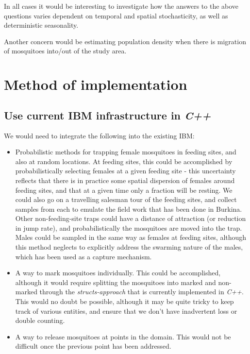 \documentclass{article}
\begin{document}
In all cases it would be interesting to investigate how the answers to the above questions varies dependent on temporal and spatial stochasticity, as well as deterministic seasonality.

Another concern would be estimating population density when there is migration of mosquitoes into/out of the study area.

\section{Method of implementation}
\subsection{Use current IBM infrastructure in \textit{C++}}
We would need to integrate the following into the existing IBM:

\begin{itemize}
\item Probabilistic methods for trapping female mosquitoes in feeding sites, and also at random locations. At feeding sites, this could be accomplished by probabilistically selecting females at a given feeding site - this uncertainty reflects that there is in practice some spatial dispersion of females around feeding sites, and that at a given time only a fraction will be resting. We could also go on a travelling salesman tour of the feeding sites, and collect samples from each to emulate the field work that has been done in Burkina. Other non-feeding-site traps could have a distance of attraction (or reduction in jump rate), and probabilistically the mosquitoes are moved into the trap. Males could be sampled in the same way as females at feeding sites, although this method neglects to explicitly address the swarming nature of the males, which has been used as a capture mechanism.
\item A way to mark mosquitoes individually. This could be accomplished, although it would require splitting the mosquitoes into marked and non-marked through the \textit{structs-approach} that is currently implemented in \textit{C++}. This would no doubt be possible, although it may be quite tricky to keep track of various entities, and ensure that we don't have inadvertent loss or double counting. 
\item A way to release mosquitoes at points in the domain. This would not be difficult once the previous point has been addressed.
\end{itemize}
\end{document}
